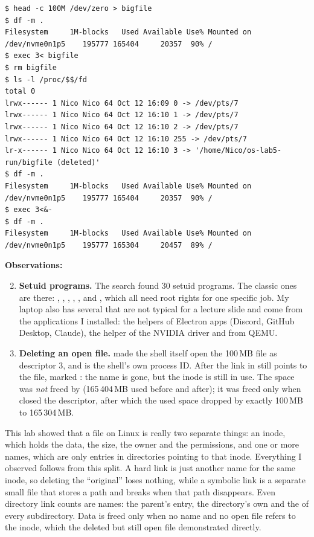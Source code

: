 \documentclass[11pt,a4paper]{article}
\begin{document}
\begin{lstlisting}[caption={(c) Deleting a file that is still open}]
$ head -c 100M /dev/zero > bigfile
$ df -m .
Filesystem     1M-blocks   Used Available Use% Mounted on
/dev/nvme0n1p5    195777 165404     20357  90% /
$ exec 3< bigfile
$ rm bigfile
$ ls -l /proc/$$/fd
total 0
lrwx------ 1 Nico Nico 64 Oct 12 16:09 0 -> /dev/pts/7
lrwx------ 1 Nico Nico 64 Oct 12 16:10 1 -> /dev/pts/7
lrwx------ 1 Nico Nico 64 Oct 12 16:10 2 -> /dev/pts/7
lrwx------ 1 Nico Nico 64 Oct 12 16:10 255 -> /dev/pts/7
lr-x------ 1 Nico Nico 64 Oct 12 16:10 3 -> '/home/Nico/os-lab5-run/bigfile (deleted)'
$ df -m .
Filesystem     1M-blocks   Used Available Use% Mounted on
/dev/nvme0n1p5    195777 165404     20357  90% /
$ exec 3<&-
$ df -m .
Filesystem     1M-blocks   Used Available Use% Mounted on
/dev/nvme0n1p5    195777 165304     20457  89% /
\end{lstlisting}

\textbf{Observations:}
\begin{enumerate}[label=(\alph*)]
  \setcounter{enumi}{1}
  \item \textbf{Setuid programs.} The search found 30 setuid programs. The classic ones are
  there: , , , , ,  and
  , which all need root rights for one specific job. My laptop also has several
  that are not typical for a lecture slide and come from the applications I installed: the
   helpers of Electron apps (Discord, GitHub Desktop, Claude), the
   helper of the NVIDIA driver and  from QEMU.
  \item \textbf{Deleting an open file.}  made the shell itself open the
  100\,MB file as descriptor 3, and \code{\$\$} is the shell's own process ID. After
   the link in  still points to the file, marked
  : the name is gone, but the inode is still in use. The space was \emph{not}
  freed by  (165\,404\,MB used before and after); it was freed only when
   closed the descriptor, after which the used space dropped by exactly 100\,MB to
  165\,304\,MB.
\end{enumerate}


This lab showed that a file on Linux is really two separate things: an inode, which holds the
data, the size, the owner and the permissions, and one or more names, which are only entries in
directories pointing to that inode. Everything I observed follows from this split. A hard link
is just another name for the same inode, so deleting the ``original'' loses nothing, while a
symbolic link is a separate small file that stores a path and breaks when that path disappears.
Even directory link counts are names: the parent's entry, the directory's own  and the
 of every subdirectory. Data is freed only when no name and no open file refers to the
inode, which the deleted but still open file demonstrated directly.
\end{document}
